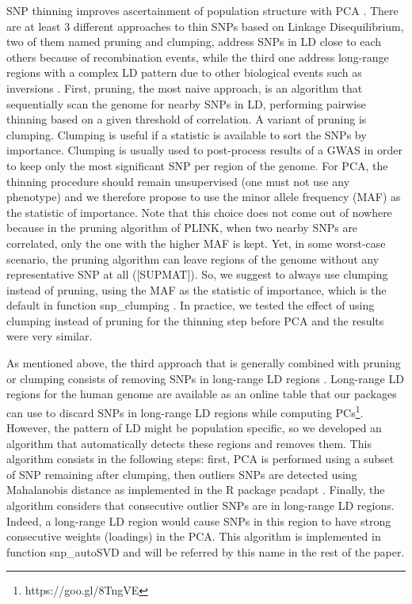 \documentclass{bioinfo}
\begin{document}
\begin{methods}
SNP thinning improves ascertainment of population structure with PCA \cite[]{Abdellaoui2013}. There are at least 3 different approaches to thin SNPs based on Linkage Disequilibrium, two of them named pruning and clumping, address SNPs in LD close to each others because of recombination events, while the third one address long-range regions with a complex LD pattern due to other biological events such as inversions \cite[]{Price2008}. 
First, pruning, the most naive approach, is an algorithm that sequentially scan the genome for nearby SNPs in LD, performing pairwise thinning based on a given threshold of correlation.
A variant of pruning is clumping. 
{\color{red}
Clumping is useful if a statistic is available to sort the SNPs by importance. Clumping is usually used to post-process results of a GWAS in order to keep only the most significant SNP per region of the genome. For PCA, the thinning procedure should remain unsupervised (one must not use any phenotype) and we therefore propose to use the minor allele frequency (MAF) as the statistic of importance. Note that this choice does not come out of nowhere because in the pruning algorithm of PLINK, when two nearby SNPs are correlated, only the one with the higher MAF is kept. Yet, in some worst-case scenario, the pruning algorithm can leave regions of the genome without any representative SNP at all ([SUPMAT]). So, we suggest to always use clumping instead of pruning, using the MAF as the statistic of importance, which is the default in function snp\_clumping . In practice, we tested the effect of using clumping instead of pruning for the thinning step before PCA and the results were very similar.
}

As mentioned above, the third approach that is generally combined with pruning or clumping consists of removing SNPs in long-range LD regions \cite[]{Price2008}. Long-range LD regions for the human genome are available as an online table that our packages can use to discard SNPs in long-range LD regions while computing PCs\footnote{https://goo.gl/8TngVE}. 
However, the pattern of LD might be population specific, so we developed an algorithm that automatically detects these regions and removes them. This algorithm consists in the following steps: first, PCA is performed using a subset of SNP remaining after clumping, then outliers SNPs are detected using Mahalanobis distance as implemented in the R package pcadapt \cite[]{Luu2017}. Finally, the algorithm considers that consecutive outlier SNPs are in long-range LD regions. Indeed, a long-range LD region would cause SNPs in this region to have strong consecutive weights (loadings) in the PCA. This algorithm is implemented in function snp\_autoSVD and will be referred by this name in the rest of the paper.



\end{methods}
\end{document}
